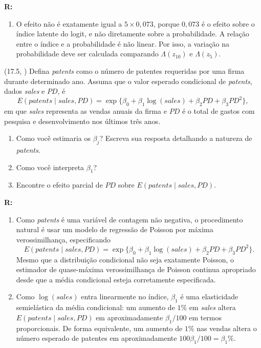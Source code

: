 \documentclass[12pt,letterpaper,onecolumn]{exam}
\renewenvironment{solution}
{\par\noindent\textbf{R:}\enspace\color{blue}}
{\par\color{black}}
\begin{document}
\begin{questions}
\begin{solution}
\begin{enumerate}[label=(\roman*)]
    \item O efeito não é exatamente igual a \(5\times 0{,}073\), porque \(0{,}073\) é o efeito sobre o índice latente do logit, e não diretamente sobre a probabilidade. A relação entre o índice e a probabilidade é não linear. Por isso, a variação na probabilidade deve ser calculada comparando \(\Lambda(z_{10})\) e \(\Lambda(z_{5})\).
\end{enumerate}
\end{solution}

\vspace{0.7cm}

\question (17.5, \citep{wooldridge2016}) Defina \textit{patents} como o número de patentes requeridas por uma firma durante determinado ano. Assuma que o valor esperado condicional de \textit{patents}, dados \textit{sales} e \(PD\), é
\[
E(patents \mid sales,PD)=\exp\{\beta_0+\beta_1\log(sales)+\beta_2 PD+\beta_3 PD^2\},
\]
em que \textit{sales} representa as vendas anuais da firma e \(PD\) é o total de gastos com pesquisa e desenvolvimento nos últimos três anos.
\begin{enumerate}[label=(\roman*)]
    \item Como você estimaria os \(\beta_j\)? Escreva sua resposta detalhando a natureza de \textit{patents}.
    \item Como você interpreta \(\beta_1\)?
    \item Encontre o efeito parcial de \(PD\) sobre \(E(patents \mid sales,PD)\).
\end{enumerate}

\begin{solution}
\begin{enumerate}[label=(\roman*)]
    \item Como \textit{patents} é uma variável de contagem não negativa, o procedimento natural é usar um modelo de regressão de Poisson por máxima verossimilhança, especificando
    \[
    E(patents \mid sales,PD)=\exp\{\beta_0+\beta_1\log(sales)+\beta_2 PD+\beta_3 PD^2\}.
    \]
    Mesmo que a distribuição condicional não seja exatamente Poisson, o estimador de quase-máxima verossimilhança de Poisson continua apropriado desde que a média condicional esteja corretamente especificada.

    \item Como \(\log(sales)\) entra linearmente no índice, \(\beta_1\) é uma elasticidade semielástica da média condicional: um aumento de \(1\%\) em \textit{sales} altera \(E(patents\mid sales,PD)\) em aproximadamente \(\beta_1/100\) em termos proporcionais. De forma equivalente, um aumento de \(1\%\) nas vendas altera o número esperado de patentes em aproximadamente \(100\beta_1/100=\beta_1\%\).


\end{enumerate}
\end{solution}
\end{questions}
\end{document}
